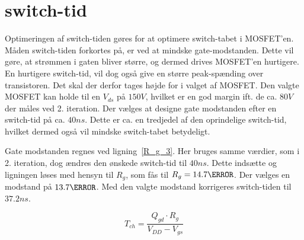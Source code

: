 
\section{switch-tid} \label{sec:switch_tid}
Optimeringen af switch-tiden gøres for at optimere switch-tabet i MOSFET'en. Måden switch-tiden forkortes på, er ved at mindske gate-modstanden. Dette vil gøre, at strømmen i gaten bliver større, og dermed drives MOSFET'en hurtigere. En hurtigere switch-tid, vil dog også give en større peak-spænding over transistoren. Det skal der derfor tages højde for i valget af MOSFET. Den valgte MOSFET kan holde til en $V_{ds}$ på $150V$, hvilket er en god margin ift. de ca. $80V$ der måles ved 2. iteration. Der vælges at designe gate modstanden efter en switch-tid på ca. $40ns$. Dette er ca. en tredjedel af den oprindelige switch-tid, hvilket dermed også vil mindske switch-tabet betydeligt. 

Gate modstanden regnes ved ligning~\ref{R_g_3}\cite{gate_res}. Her bruges samme værdier, som i 2. iteration, dog ændres den ønskede switch-tid til $40ns$. Dette indsætte og ligningen løses med hensyn til $R_{g}$, som fås til $R_{g}=14.7\ohm$. Der vælges en modstand på $13.7\ohm$. Med den valgte modstand korrigeres switch-tiden til $37.2ns$.

\begin{equation} \label{R_g_3}
T_{ch} = \frac{Q_{gd} \cdot R_{g}}{V_{DD}-V_{gs}}
\end{equation}

 